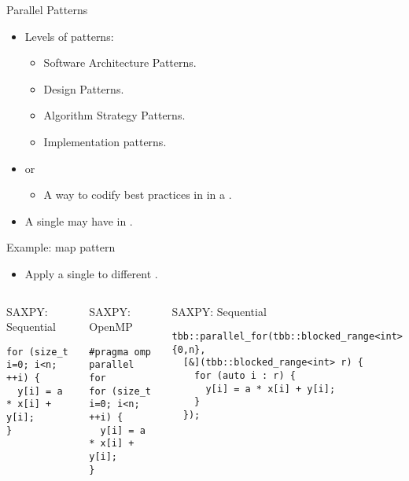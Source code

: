\begin{frame}[t]{Parallel Patterns}
\begin{itemize}
  \item Levels of patterns:
    \begin{itemize}
      \item Software Architecture Patterns.
      \item Design Patterns.
      \item Algorithm Strategy Patterns.
      \item Implementation patterns.
    \end{itemize}

  \vfill\pause
  \item {} or 
    \begin{itemize}
      \item A way to codify best practices in  
            in a .
    \end{itemize}

  \vfill\pause
  \item A single  may have 
        in .
  
\end{itemize}
\end{frame}

\begin{frame}[t,fragile]{Example: map pattern}
\begin{itemize}
  \item Apply a single  to different .
\end{itemize}
\begin{columns}

\begin{block}{SAXPY: Sequential}
\begin{lstlisting}
for (size_t i=0; i<n; ++i) {
  y[i] = a * x[i] + y[i];
}
\end{lstlisting}
\end{block}

\pause

\begin{block}{SAXPY: OpenMP}
\begin{lstlisting}
#pragma omp parallel for
for (size_t i=0; i<n; ++i) {
  y[i] = a * x[i] + y[i];
}
\end{lstlisting}
\end{block}

\pause

\begin{block}{SAXPY: Sequential}
\begin{lstlisting}
tbb::parallel_for(tbb::blocked_range<int>{0,n},
  [&](tbb::blocked_range<int> r) {
    for (auto i : r) {
      y[i] = a * x[i] + y[i];
    }
  });
\end{lstlisting}
\end{block}
\end{columns}
\end{frame}

